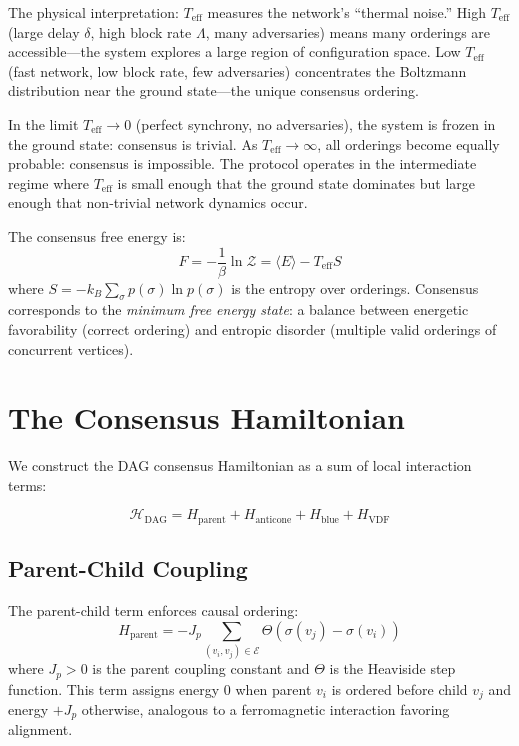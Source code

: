 \documentclass[12pt,a4paper,twocolumn]{article}
\newcommand{\Hdag}{\mathcal{H}_{\mathrm{DAG}}}
\newcommand{\Zpart}{\mathcal{Z}}
\newcommand{\edgeset}{\mathcal{E}}
\newcommand{\Teff}{T_{\mathrm{eff}}}
\begin{document}
The physical interpretation: $\Teff$ measures the network's ``thermal noise.'' High $\Teff$ (large delay $\delta$, high block rate $\Lambda$, many adversaries) means many orderings are accessible---the system explores a large region of configuration space. Low $\Teff$ (fast network, low block rate, few adversaries) concentrates the Boltzmann distribution near the ground state---the unique consensus ordering.

In the limit $\Teff \to 0$ (perfect synchrony, no adversaries), the system is frozen in the ground state: consensus is trivial. As $\Teff \to \infty$, all orderings become equally probable: consensus is impossible. The protocol operates in the intermediate regime where $\Teff$ is small enough that the ground state dominates but large enough that non-trivial network dynamics occur.

The consensus free energy is:
\begin{equation}
F = -\frac{1}{\beta} \ln \Zpart = \langle E \rangle - \Teff S
\end{equation}
where $S = -k_B \sum_\sigma p(\sigma) \ln p(\sigma)$ is the entropy over orderings. Consensus corresponds to the \emph{minimum free energy state}: a balance between energetic favorability (correct ordering) and entropic disorder (multiple valid orderings of concurrent vertices).

\section{The Consensus Hamiltonian}
\label{sec:hamiltonian}

We construct the DAG consensus Hamiltonian as a sum of local interaction terms:

\begin{equation}
\Hdag = H_{\mathrm{parent}} + H_{\mathrm{anticone}} + H_{\mathrm{blue}} + H_{\mathrm{VDF}}
\end{equation}

\subsection{Parent-Child Coupling}

The parent-child term enforces causal ordering:
\begin{equation}
H_{\mathrm{parent}} = -J_p \sum_{(v_i, v_j) \in \edgeset} \Theta(\sigma(v_j) - \sigma(v_i))
\end{equation}
where $J_p > 0$ is the parent coupling constant and $\Theta$ is the Heaviside step function. This term assigns energy $0$ when parent $v_i$ is ordered before child $v_j$ and energy $+J_p$ otherwise, analogous to a ferromagnetic interaction favoring alignment.
\end{document}

